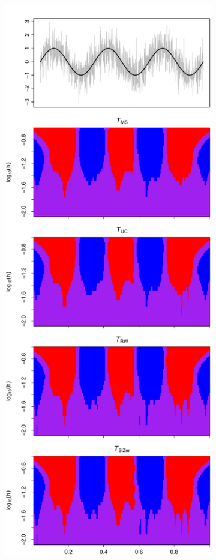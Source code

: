 \begin{figure}[p]
\begin{subfigure}[b]{0.475\textwidth}
\includegraphics[width=\textwidth]{Plots/SiZer_map_T_1000_sine_a1_-50.pdf}

\end{subfigure}
\end{figure}
